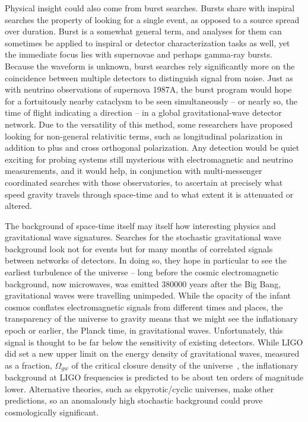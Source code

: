 		Physical insight could also come from burst searches. Bursts share with inspiral searches the property of looking for a single event, as opposed to a source spread over duration. Burst is a somewhat general term, and analyses for them can sometimes be applied to inspiral or detector characterization tasks as well, yet the immediate focus lies with supernovae and perhaps gamma-ray bursts. Because the waveform is unknown, burst searches rely significantly more on the coincidence between multiple detectors to distinguish signal from noise. Just as with neutrino observations of supernova 1987A, the burst program would hope for a fortuitously nearby cataclysm to be seen simultaneously -- or nearly so, the time of flight indicating a direction -- in a global gravitational-wave detector network. Due to the versatility of this method, some researchers have proposed looking for non-general relativitic terms, such as longitudinal polarization in addition to plus and cross orthogonal polarization. Any detection would be quiet exciting for probing systems still mysterious with electromagnetic and neutrino measurements, and it would help, in conjunction with multi-messenger coordinated searches with those observatories, to ascertain at precisely what speed gravity travels through space-time and to what extent it is attenuated or altered.

The background of space-time itself may itself how interesting physics and gravitational wave signatures. Searches for the stochastic gravitational wave background look not for events but for many months of correlated signals between networks of detectors. In doing so, they hope in particular to see the earliest turbulence of the universe -- long before the cosmic electromagnetic background, now microwaves, was emitted 380000 years after the Big Bang, gravitational waves were travelling unimpeded. While the opacity of the infant cosmos conflates electromagnetic signals from different times and places, the transparency of the universe to gravity means that we might see the inflationary epoch or earlier, the Planck time, in gravitational waves. Unfortunately, this signal is thought to be far below the sensitivity of existing detectors. While LIGO did set a new upper limit on the energy density of gravitational waves, measured as a fraction, $\Omega_{gw}$ of the critical closure density of the universe~\cite{LIGOStochasticNature2009}, the inflationary background at LIGO frequencies is predicted to be about ten orders of magnitude lower. Alternative theories, such as ekpyrotic/cyclic universes, make other predictions, so an anomalously high stochastic background could prove cosmologically significant.

